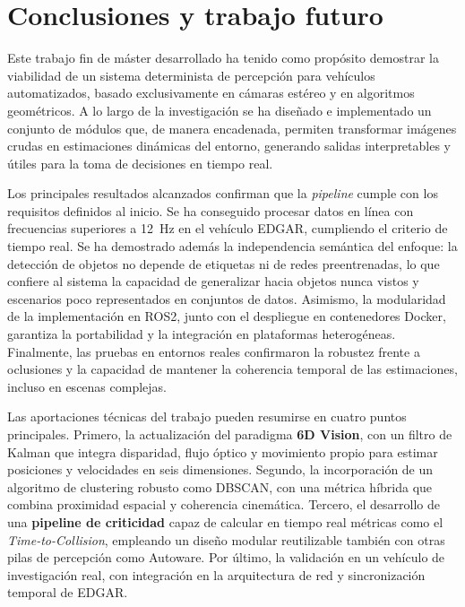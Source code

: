 \section{Conclusiones y trabajo futuro}
\label{sec:conclusiones_y_trabajo_futuro}

Este trabajo fin de máster desarrollado ha tenido como propósito demostrar la
viabilidad de un sistema determinista de percepción para vehículos
automatizados, basado exclusivamente en cámaras estéreo y en algoritmos
geométricos. A lo largo de la investigación se ha diseñado e implementado un
conjunto de módulos que, de manera encadenada, permiten transformar imágenes
crudas en estimaciones dinámicas del entorno, generando salidas interpretables
y útiles para la toma de decisiones en tiempo real.

Los principales resultados alcanzados confirman que la \textit{pipeline}
cumple con los requisitos definidos al inicio. Se ha conseguido procesar datos
en línea con frecuencias superiores a 12~Hz en el vehículo EDGAR, cumpliendo el
criterio de tiempo real. Se ha demostrado además la independencia semántica del
enfoque: la detección de objetos no depende de etiquetas ni de redes
preentrenadas, lo que confiere al sistema la capacidad de generalizar hacia
objetos nunca vistos y escenarios poco representados en conjuntos de datos.
Asimismo, la modularidad de la implementación en ROS2, junto con el despliegue
en contenedores Docker, garantiza la portabilidad y la integración en
plataformas heterogéneas. Finalmente, las pruebas en entornos reales confirmaron
la robustez frente a oclusiones y la capacidad de mantener la coherencia
temporal de las estimaciones, incluso en escenas complejas.

Las aportaciones técnicas del trabajo pueden resumirse en cuatro puntos
principales. Primero, la actualización del paradigma \textbf{6D Vision}, con un
filtro de Kalman que integra disparidad, flujo óptico y movimiento propio para estimar
posiciones y velocidades en seis dimensiones. Segundo, la incorporación de un
algoritmo de clustering robusto como DBSCAN, con una métrica híbrida que
combina proximidad espacial y coherencia cinemática. Tercero, el desarrollo de
una \textbf{pipeline de criticidad} capaz de calcular en tiempo real métricas
como el \textit{Time-to-Collision}, empleando un diseño modular reutilizable
también con otras pilas de percepción como Autoware. Por último, la validación
en un vehículo de investigación real, con integración en la arquitectura de red
y sincronización temporal de EDGAR.

